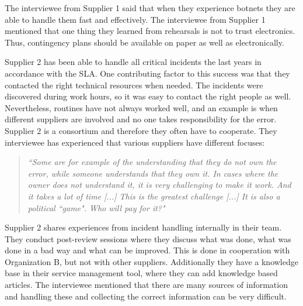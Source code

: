 The interviewee from Supplier 1 said that when they experience botnets they are able to handle them fast and effectively. The interviewee from Supplier 1 mentioned that one thing they learned from rehearsals is not to trust electronics. Thus, contingency plans should be available on paper as well as electronically.

Supplier 2 has been able to handle all critical incidents the last years in accordance with the \ac{SLA}. One contributing factor to this success was that they contacted the right technical resources when needed. The incidents were discovered during work hours, so it was easy to contact the right people as well. Nevertheless, routines have not always worked well, and an example is when different suppliers are involved and no one takes responsibility for the error. Supplier 2 is a consortium and therefore they often have to cooperate. They interviewee has experienced that various suppliers have different focuses:

\begin{quote}
\textit{``Some are for example of the understanding that they do not own the error, while someone understands that they own it. In cases where the owner does not understand it, it is very challenging to make it work. And it takes a lot of time [...] This is the greatest challenge [...] It is also a political ``game". Who will pay for it?"}
\end{quote}

Supplier 2 shares experiences from incident handling internally in their team. They conduct post-review sessions where they discuss what was done, what was done in a bad way and what can be improved. This is done in cooperation with Organization B, but not with other suppliers. Additionally they have a knowledge base in their service management tool, where they can add knowledge based articles. The interviewee mentioned that there are many sources of information and handling these and collecting the correct information can be very difficult.

